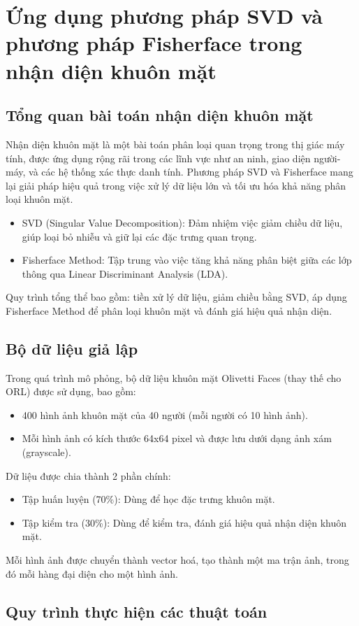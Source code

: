 \documentclass[a4paper,12pt]{extarticle}
\begin{document}
\section{Ứng dụng phương pháp SVD và phương pháp Fisherface trong nhận diện khuôn mặt}
\subsection{Tổng quan bài toán nhận diện khuôn mặt}
Nhận diện khuôn mặt là một bài toán phân loại quan trọng trong thị giác máy tính, được ứng dụng rộng rãi trong các lĩnh vực như an ninh, giao diện người-máy, và các hệ thống xác thực danh tính. Phương pháp SVD và Fisherface mang lại giải pháp hiệu quả trong việc xử lý dữ liệu lớn và tối ưu hóa khả năng phân loại khuôn mặt.
\begin{itemize}
    \item SVD (Singular Value Decomposition): Đảm nhiệm việc giảm chiều dữ liệu, giúp loại bỏ nhiễu và giữ lại các đặc trưng quan trọng.
    \item Fisherface Method: Tập trung vào việc tăng khả năng phân biệt giữa các lớp thông qua Linear Discriminant Analysis (LDA).
\end{itemize}
Quy trình tổng thể bao gồm: tiền xử lý dữ liệu, giảm chiều bằng SVD, áp dụng Fisherface Method để phân loại khuôn mặt và đánh giá hiệu quả nhận diện.
\subsection{Bộ dữ liệu giả lập}
Trong quá trình mô phỏng, bộ dữ liệu khuôn mặt Olivetti Faces (thay thế cho ORL) được sử dụng, bao gồm:
\begin{itemize}
    \item 400 hình ảnh khuôn mặt của 40 người (mỗi người có 10 hình ảnh).
    \item Mỗi hình ảnh có kích thước 64x64 pixel và được lưu dưới dạng ảnh xám (grayscale).
\end{itemize}
Dữ liệu được chia thành 2 phần chính:
\begin{itemize}
    \item Tập huấn luyện (70\%): Dùng để học đặc trưng khuôn mặt.
    \item Tập kiểm tra (30\%): Dùng để kiểm tra, đánh giá hiệu quả nhận diện khuôn mặt. 
\end{itemize}
Mỗi hình ảnh được chuyển thành vector hoá, tạo thành một ma trận ảnh, trong đó mỗi hàng đại diện cho một hình ảnh.
\subsection{Quy trình thực hiện các thuật toán}
\end{document}

